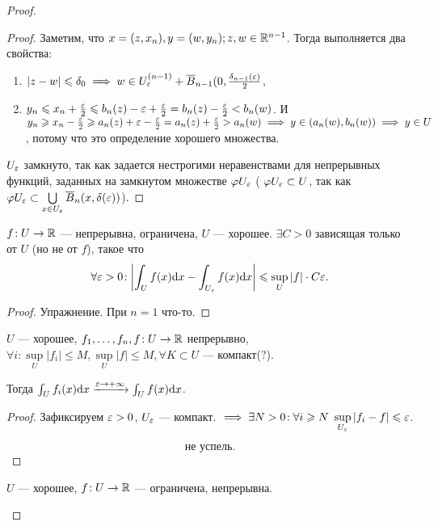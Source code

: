\begin{proof}
\begin{proof}
        Заметим, что $x = (z, x_n), y = (w, y_n); z, w \in \mathbb{R}^{n-1}$. Тогда выполняется два свойства:
         \begin{enumerate}
             \item $|z-w| \leqslant \delta_0 \implies w \in U_{\varepsilon}^{(n-1)} + \overline{B}_{n-1}(0, \frac{\delta_{n-1}(\varepsilon)}{2}$,
             \item $y_n \leqslant  x_n + \frac{\varepsilon}{2} \leqslant  b_n(z) - \varepsilon + \frac{\varepsilon}{2} = b_n(z) - \frac{\varepsilon}{2} <b_n(w)$. И $y_n \geqslant  x_n - \frac{\varepsilon}{2} \geqslant  a_n(z) + \varepsilon - \frac{\varepsilon}{2} = a_n(z) + \frac{\varepsilon}{2} > a_n(w) \implies y \in (a_n(w), b_n(w)) \implies y \in U$, потому что это определение хорошего множества.
        \end{enumerate}
        $U_\varepsilon$ замкнуто, так как задается нестрогими неравенствами для непрерывных функций, заданных на замкнутом множестве  $\varphi U_{\varepsilon}$ ( $\varphi U_{\varepsilon} \subset U$, так как $\varphi U_{\varepsilon} \subset \bigcup\limits_{x \in U_{\varepsilon}} \overline{B}_n(x, \delta(\varepsilon))$).
    \end{proof}
    \begin{statement}
        $f\!: U \to \mathbb{R}$ --- непрерывна, ограничена, $U$ --- хорошее.  $\exists C > 0$ зависящая только от $U$ (но не от  $f$), такое что 
        \[
            \forall \varepsilon > 0\!: \left| \int_U f(x)\mathrm{d}x - \int_{U_{\varepsilon}} f(x)\mathrm{d}x \right| \leqslant  \sup\limits_{U}  |f| \cdot C \varepsilon
        .\] 
    \end{statement}
    \begin{proof}
        Упражнение. При $n=1$ что-то.
    \end{proof}
    \begin{consequence}
        $U$ --- хорошее,  $f_1, \ldots, f_n, f\!: U \to \mathbb{R}$ непрерывно, $\forall i\!: \sup\limits_U |f_i| \le  M, \sup\limits_U |f| \le  M, \forall K \subset U$ --- компакт(?).

        Тогда $\int_U f_i(x)\mathrm{d}x \xrightarrow{\varepsilon \to  +\infty} \int_U f(x) \mathrm{d}x$.
    \end{consequence}
    \begin{proof}
        Зафиксируем $\varepsilon > 0$,  $U_\varepsilon$ --- компакт. $\implies \exists N > 0\!: \forall i \ge  N\ \sup\limits_{U_\eps} |f_i - f| \le \eps$.

        \[
            \text{не успель}
        .\] 
    \end{proof}
    \begin{lemma}
        $U$ --- хорошее,  $f\!: U \to \mathbb{R}$ --- ограничена, непрерывна.  


\end{lemma}
\end{proof}
